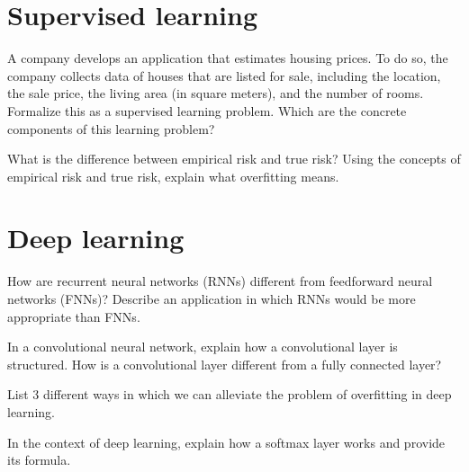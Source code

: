 \documentclass[11pt]{article}
\newcounter{marks}
\begin{document}
\section*{Supervised learning}
\begin{list}{{\bf Question 3.:}}
	{
	}

\item
{}
\addtocounter{marks}{1}
A company develops an application that estimates housing prices. To do so, the company collects data of houses that are listed for sale, including the location, the sale price, the living area (in square meters), and the number of rooms. Formalize this as a supervised learning problem. Which are the concrete components of this learning problem?

\item
{}
\addtocounter{marks}{1}
What is the difference between empirical risk and true risk? Using the concepts of empirical risk and true risk, explain what overfitting means.

\end{list}

\pagebreak

\section*{Deep learning}
\begin{list}{{\bf Question 4.:}}
	{
	}

\item
{}
\addtocounter{marks}{1}
How are recurrent neural networks (RNNs) different from feedforward neural networks (FNNs)? Describe an application in which RNNs would be more appropriate than FNNs.

\item
{}
\addtocounter{marks}{1}
In a convolutional neural network, explain how a convolutional layer is structured. How is a convolutional layer different from a fully connected layer?

\item
{}
\addtocounter{marks}{1}
List 3 different ways in which we can alleviate the problem of overfitting in deep learning.

\item
{}
\addtocounter{marks}{1}
In the context of deep learning, explain how a softmax layer works and provide its formula.

\end{list}
\end{document}
